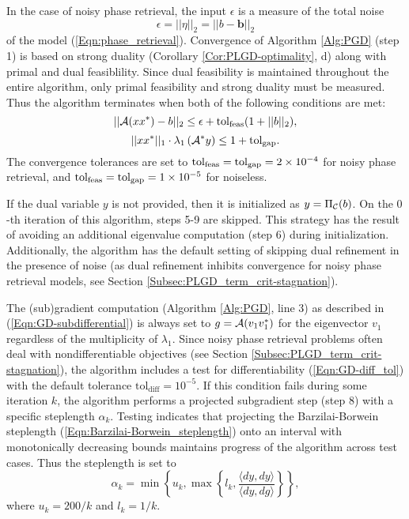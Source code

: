 In the case of noisy phase retrieval, the input $\epsilon$ is a measure of the total noise \[
\epsilon = ||\eta||_2 = ||b - \mathbf{b}||_2 
\] of the model (\ref{Eqn:phase_retrieval}).  Convergence of Algorithm \ref{Alg:PGD} (step 1) is based on strong duality (Corollary \ref{Cor:PLGD-optimality}, d) along with primal and dual feasiblility. Since dual feasibility is maintained throughout the entire algorithm, only primal feasibility and strong duality must be measured.  Thus the algorithm terminates when both of the following conditions are met:
\begin{equation} \label{Eqn:saga_conv_crit_primal}
|| {\mathcal A}(xx^*) - b ||_2 \leq \epsilon + \textnormal{tol}_\textnormal{feas} (1 + ||b||_2),
\end{equation}
\begin{equation} \label{Eqn:saga_conv_crit_gap}
 ||xx^*||_1 \cdot \lambda_1 \left( {\mathcal A}^* y \right)  \leq 1 +  \textnormal{tol}_\textnormal{gap}.
\end{equation}
The convergence tolerances are set to $ \textnormal{tol}_\textnormal{feas} = \textnormal{tol}_\textnormal{gap} = 2 \times 10^{-4}$ for noisy phase retrieval, and $ \textnormal{tol}_\textnormal{feas} = \textnormal{tol}_\textnormal{gap} = 1 \times 10^{-5}$ for noiseless.


If the dual variable $y$ is not provided, then it is initialized as $y= \Pi_{\mathcal C}(b)$.  On the $0$-th iteration of this algorithm, steps 5-9 are skipped.  This strategy has the result of avoiding an additional eigenvalue computation (step 6) during initialization.  Additionally, the algorithm has the default setting of skipping dual refinement in the presence of noise (as dual refinement inhibits convergence for noisy phase retrieval models, see Section \ref{Subsec:PLGD_term_crit-stagnation}).


The (sub)gradient computation (Algorithm \ref{Alg:PGD}, line 3) as described in (\ref{Eqn:GD-subdifferential}) is always set to $g = {\mathcal A}(v_1v_1^*)$ for the eigenvector $v_1$ regardless of the multiplicity of $\lambda_1$.  Since noisy phase retrieval problems often deal with nondifferentiable objectives (see Section \ref{Subsec:PLGD_term_crit-stagnation}), the algorithm includes a test for differentiability (\ref{Eqn:GD-diff_tol}) with the default tolerance $\text{tol}_\text{diff} = 10^{-5}$.  If this condition fails during some iteration $k$, the algorithm performs a projected subgradient step (step 8) with a specific steplength $\alpha_k$.  Testing indicates that projecting the Barzilai-Borwein steplength (\ref{Eqn:Barzilai-Borwein_steplength}) onto an interval with monotonically decreasing bounds maintains progress of the algorithm across test cases.  Thus the steplength is set to
\begin{equation} 			\label{Eqn:GD-steplength}
\alpha_k = \min \left\{ u_k, \max \left\{ l_k, \frac{\langle dy, dy \rangle}{\langle dy, dg \rangle} \right\} \right\},
\end{equation}
where $u_k = 200/k$ and $l_k = 1/k$.



